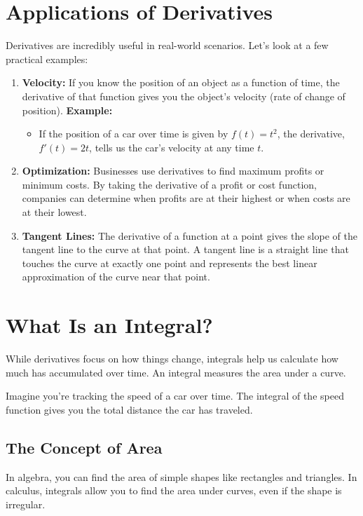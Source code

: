 \section{Applications of Derivatives}
Derivatives are incredibly useful in real-world scenarios. Let’s look at a few practical examples:
\begin{enumerate}
    \item \textbf{Velocity:} If you know the position of an object as a function of time, the derivative of that function gives you the object’s velocity (rate of change of position).
    \textbf{Example:}
    \begin{itemize}
        \item If the position of a car over time is given by \( f(t) = t^2 \), the derivative, \( f'(t) = 2t \), tells us the car’s velocity at any time \( t \).
    \end{itemize}
    \item \textbf{Optimization:} Businesses use derivatives to find maximum profits or minimum costs. By taking the derivative of a profit or cost function, companies can determine when profits are at their highest or when costs are at their lowest.
    \item \textbf{Tangent Lines:} The derivative of a function at a point gives the slope of the tangent line to the curve at that point. A tangent line is a straight line that touches the curve at exactly one point and represents the best linear approximation of the curve near that point.
\end{enumerate}

\section{What Is an Integral?}
While derivatives focus on how things change, integrals help us calculate how much has accumulated over time. An integral measures the area under a curve.

Imagine you’re tracking the speed of a car over time. The integral of the speed function gives you the total distance the car has traveled.

\subsection{The Concept of Area}
In algebra, you can find the area of simple shapes like rectangles and triangles. In calculus, integrals allow you to find the area under curves, even if the shape is irregular.

